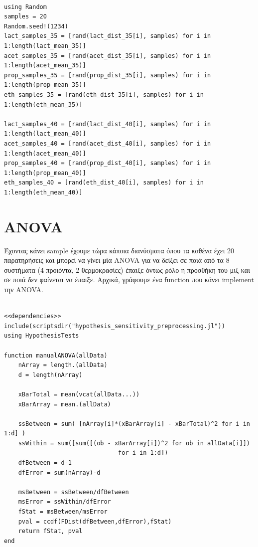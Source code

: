 \documentclass[11pt]{article}
\begin{document}
\begin{verbatim}

using Random
samples = 20
Random.seed!(1234)
lact_samples_35 = [rand(lact_dist_35[i], samples) for i in 1:length(lact_mean_35)]
acet_samples_35 = [rand(acet_dist_35[i], samples) for i in 1:length(acet_mean_35)]
prop_samples_35 = [rand(prop_dist_35[i], samples) for i in 1:length(prop_mean_35)]
eth_samples_35 = [rand(eth_dist_35[i], samples) for i in 1:length(eth_mean_35)]

lact_samples_40 = [rand(lact_dist_40[i], samples) for i in 1:length(lact_mean_40)]
acet_samples_40 = [rand(acet_dist_40[i], samples) for i in 1:length(acet_mean_40)]
prop_samples_40 = [rand(prop_dist_40[i], samples) for i in 1:length(prop_mean_40)]
eth_samples_40 = [rand(eth_dist_40[i], samples) for i in 1:length(eth_mean_40)]

\end{verbatim}

\section{ANOVA}
\label{sec:orgdb043ba}
Έχοντας κάνει sample έχουμε τώρα κάποια διανύσματα όπου τα καθένα έχει 20 παρατηρήσεις και μπορεί να γίνει μία ANOVA για να δείξει σε ποιά από τα 8 συστήματα (4 προιόντα, 2 θερμοκρασίες) έπαιξε όντως ρόλο η προσθήκη του μιξ και σε ποιά δεν φαίνεται να έπαιξε. Αρχικά, γράφουμε ένα function που κάνει implement την ANOVA.

\begin{verbatim}

<<dependencies>>
include(scriptsdir("hypothesis_sensitivity_preprocessing.jl"))
using HypothesisTests

function manualANOVA(allData)
    nArray = length.(allData)
    d = length(nArray)

    xBarTotal = mean(vcat(allData...))
    xBarArray = mean.(allData)

    ssBetween = sum( [nArray[i]*(xBarArray[i] - xBarTotal)^2 for i in 1:d] )
    ssWithin = sum([sum([(ob - xBarArray[i])^2 for ob in allData[i]])
                                for i in 1:d])
    dfBetween = d-1
    dfError = sum(nArray)-d

    msBetween = ssBetween/dfBetween
    msError = ssWithin/dfError
    fStat = msBetween/msError
    pval = ccdf(FDist(dfBetween,dfError),fStat)
    return fStat, pval
end

\end{verbatim}
\end{document}
